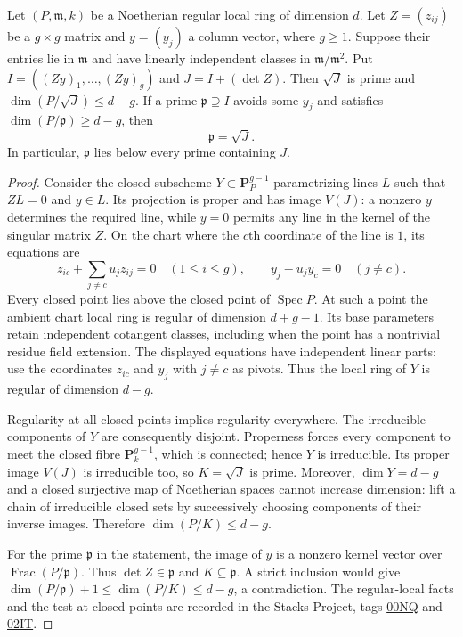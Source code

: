 \begin{lemma}
\label{lem:selmer-local-incidence}
Let $(P,\mathfrak m,k)$ be a Noetherian regular local ring of dimension
$d$.  Let $Z=(z_{ij})$ be a $g\times g$ matrix and $y=(y_j)$ a column
vector, where $g\geq1$.  Suppose their entries lie in $\mathfrak m$ and
have linearly independent classes in $\mathfrak m/\mathfrak m^2$.
Put $I=((Zy)_1,\ldots,(Zy)_g)$ and $J=I+(\det Z)$.
Then $\sqrt J$ is prime and $\dim(P/\sqrt J)\leq d-g$.
If a prime $\mathfrak p\supseteq I$ avoids some $y_j$ and satisfies
$\dim(P/\mathfrak p)\geq d-g$, then
\[
                   \mathfrak p=\sqrt J.
\]
In particular, $\mathfrak p$ lies below every prime containing $J$.
\end{lemma}

\begin{proof}
Consider the closed subscheme $Y\subset\mathbf P^{g-1}_P$ parametrizing
lines $L$ such that $ZL=0$ and $y\in L$.  Its projection is proper and
has image $V(J)$: a nonzero $y$ determines the required line, while
$y=0$ permits any line in the kernel of the singular matrix $Z$.
On the chart where the $c$th coordinate of the line is $1$, its equations
are
\[
 z_{ic}+\sum_{j\ne c}u_jz_{ij}=0\quad(1\leq i\leq g),
 \qquad y_j-u_jy_c=0\quad(j\ne c).
\]
Every closed point lies above the closed point of $\operatorname{Spec}P$.
At such a point the ambient chart local ring is regular of dimension
$d+g-1$.  Its base parameters retain independent cotangent classes,
including when the point has a nontrivial residue field extension.
The displayed equations have independent linear parts: use the
coordinates $z_{ic}$ and $y_j$ with $j\ne c$ as pivots.  Thus the local
ring of $Y$ is regular of dimension $d-g$.

Regularity at all closed points implies regularity everywhere.  The
irreducible components of $Y$ are consequently disjoint.  Properness
forces every component to meet the closed fibre
$\mathbf P^{g-1}_k$, which is connected; hence $Y$ is irreducible.
Its proper image $V(J)$ is irreducible too, so $K=\sqrt J$ is prime.
Moreover, $\dim Y=d-g$ and a closed surjective map of Noetherian spaces
cannot increase dimension: lift a chain of irreducible closed sets by
successively choosing components of their inverse images.  Therefore
$\dim(P/K)\leq d-g$.

For the prime $\mathfrak p$ in the statement, the image of $y$ is a
nonzero kernel vector over $\operatorname{Frac}(P/\mathfrak p)$.
Thus $\det Z\in\mathfrak p$ and $K\subseteq\mathfrak p$.
A strict inclusion would give
$\dim(P/\mathfrak p)+1\leq\dim(P/K)\leq d-g$, a contradiction.
The regular-local facts and the test at closed points are recorded in
the Stacks Project, tags
\href{https://stacks.math.columbia.edu/tag/00NQ}{00NQ} and
\href{https://stacks.math.columbia.edu/tag/02IT}{02IT}.
\end{proof}

